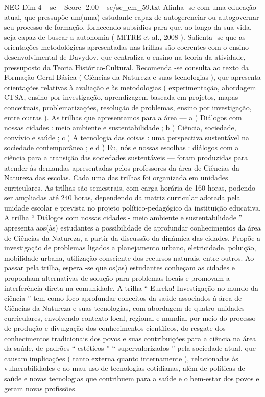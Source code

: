 \begin{textsample}{NEG Dim 4 – sc – Score -2.00 – sc/sc\_em\_59.txt}
Alinha -se com uma educação atual, que pressupõe um(uma) estudante capaz de autogerenciar ou autogovernar seu processo de formação, fornecendo subsídios para que, ao longo da sua vida, seja capaz de buscar a autonomia ( MITRE et al., 2008 ).
Salienta -se que as orientações metodológicas apresentadas nas trilhas são coerentes com o ensino desenvolvimental de Davydov, que centraliza o ensino na teoria da atividade, pressuposto da Teoria Histórico-Cultural.
Recomenda -se consulta ao texto da Formação Geral Básica ( Ciências da Natureza e suas tecnologias ), que apresenta orientações relativas à avaliação e às metodologias ( experimentação, abordagem CTSA, ensino por investigação, aprendizagem baseada em projetos, mapas conceituais, problematizações, resolução de problemas, ensino por investigação, entre outras ).
As trilhas que apresentamos para a área — a ) Diálogos com nossas cidades : meio ambiente e sustentabilidade ; b ) Ciência, sociedade, convívio e saúde ; c ) A tecnologia das coisas : uma perspectiva sustentável na sociedade contemporânea ; e d ) Eu, nós e nossas escolhas : diálogos com a ciência para a transição das sociedades sustentáveis — foram produzidas para atender às demandas apresentadas pelos professores da área de Ciências da Natureza das escolas.
Cada uma das trilhas foi organizada em unidades curriculares.
As trilhas são semestrais, com carga horária de 160 horas, podendo ser ampliadas até 240 horas, dependendo da matriz curricular adotada pela unidade escolar e prevista no projeto político-pedagógico da instituição educativa.
A trilha “ Diálogos com nossas cidades - meio ambiente e sustentabilidade ” apresenta aos(às) estudantes a possibilidade de aprofundar conhecimentos da área de Ciências da Natureza, a partir da discussão da dinâmica das cidades.
Propõe a investigação de problemas ligados a planejamento urbano, eletricidade, poluição, mobilidade urbana, utilização consciente dos recursos naturais, entre outros.
Ao passar pela trilha, espera -se que os(as) estudantes conheçam as cidades e proponham alternativas de solução para problemas locais e promovam a interferência direta na comunidade.
A trilha “ Eureka!
Investigação no mundo da ciência ” tem como foco aprofundar conceitos da saúde associados à área de Ciências da Natureza e suas tecnologias, com abordagem de quatro unidades curriculares, envolvendo contexto local, regional e mundial por meio do processo de produção e divulgação dos conhecimentos científicos, do resgate dos conhecimentos tradicionais dos povos e suas contribuições para a ciência na área da saúde, de padrões “ estéticos ” “ supervalorizados ” pela sociedade atual, que causam implicações ( tanto externa quanto internamente ), relacionadas às vulnerabilidades e ao mau uso de tecnologias cotidianas, além de políticas de saúde e novas tecnologias que contribuem para a saúde e o bem-estar dos povos e geram novas profissões.

\end{textsample}
